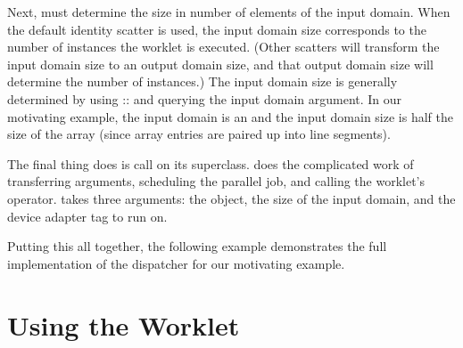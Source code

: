 
Next,  must determine the size in number of elements of the input domain.
When the default identity scatter is used, the input domain size corresponds to the number of instances the worklet is executed.
(Other scatters will transform the input domain size to an output domain size, and that output domain size will determine the number of instances.)
The input domain size is generally determined by using :: and querying the input domain argument.
In our motivating example, the input domain is an  and the input domain size is half the size of the array (since array entries are paired up into line segments).

The final thing  does is call  on its  superclass.
 does the complicated work of transferring arguments, scheduling the parallel job, and calling the worklet's operator.
 takes three arguments: the  object, the size of the input domain, and the device adapter tag to run on.


Putting this all together, the following example demonstrates the full implementation of the dispatcher for our motivating example.




\section{Using the Worklet}
\label{sec:NewWorkletTypes:Using}



